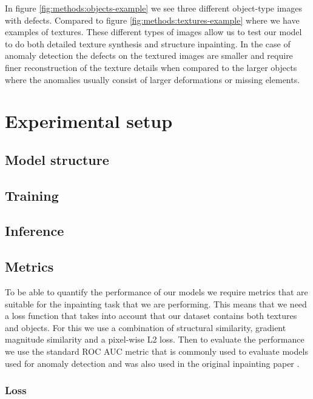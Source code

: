 In figure \ref{fig:methods:objects-example} we see three different object-type images with defects. Compared to figure \ref{fig:methods:textures-example} where we have examples of textures. These different types of images allow us to test our model to do both detailed texture synthesis and structure inpainting. In the case of anomaly detection the defects on the textured images are smaller and require finer reconstruction of the texture details when compared to the larger objects where the anomalies usually consist of larger deformations or missing elements.

\section{Experimental setup}

\subsection{Model structure}

\subsection{Training}

\subsection{Inference}

\subsection{Metrics}


To be able to quantify the performance of our models we require metrics that are suitable for the inpainting task that we are performing. This means that we need a loss function that takes into account that our dataset contains both textures and objects. For this we use a combination of structural similarity, gradient magnitude similarity and a pixel-wise L2 loss. Then to evaluate the performance we use the standard ROC AUC metric that is commonly used to evaluate models used for anomaly detection and was also used in the original inpainting paper \cite{pirnay_inpainting_2021, zavrtanik_reconstruction_2021}.


\subsubsection{Loss}

